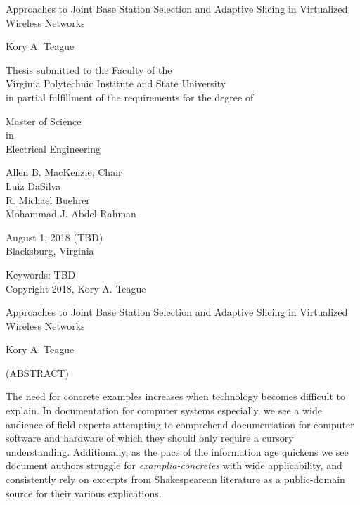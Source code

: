 \documentclass[12pt,dvipsnames]{report}
\begin{document}
\thispagestyle{empty}
\begin{center}

{\Large 
Approaches to Joint Base Station Selection and Adaptive Slicing in Virtualized Wireless Networks
}

\vfill

Kory A. Teague

\vfill

Thesis submitted to the Faculty of the \\
Virginia Polytechnic Institute and State University \\
in partial fulfillment of the requirements for the degree of

\vfill

Master of Science \\
in \\
Electrical Engineering

\vfill

Allen B. MacKenzie, Chair \\
Luiz DaSilva \\
R. Michael Buehrer \\
Mohammad J. Abdel-Rahman

\vfill

August 1, 2018 (TBD)\\
Blacksburg, Virginia

\vfill

Keywords: TBD
\\
Copyright 2018, Kory A. Teague

\end{center}

\pagebreak

\thispagestyle{empty}
\begin{center}

{\large Approaches to Joint Base Station Selection and Adaptive Slicing in Virtualized Wireless Networks}

\vfill

Kory A. Teague

\vfill

(ABSTRACT)

\vfill

\end{center}

\iffalse
The need for concrete examples increases when technology becomes
difficult to explain.  In documentation for computer systems
especially, we see a wide audience of field experts attempting to
comprehend documentation for computer software and hardware of which
they should only require a cursory understanding.  Additionally, as
the pace of the information age quickens we see document authors
struggle for \textit{examplia-concretes} with wide applicability, and
consistently rely on excerpts from Shakespearean literature as a
public-domain source for their various explications.
\end{document}
